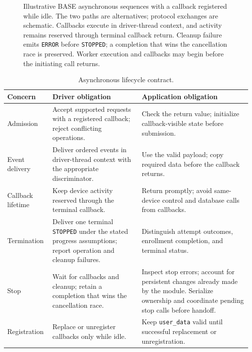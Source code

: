 \begin{figure}[t]
{%
}
\caption{Illustrative BASE asynchronous sequences with a callback registered while idle. The two paths are alternatives; protocol exchanges are schematic. Callbacks execute in driver-thread context, and activity remains reserved through terminal callback return. Cleanup failure emits \texttt{ERROR} before \texttt{STOPPED}; a completion that wins the cancellation race is preserved. Worker execution and callbacks may begin before the initiating call returns.}
\label{fig:async_lifecycle}
\end{figure}

\begin{table}[!t]
\centering
\caption{Asynchronous lifecycle contract.}
\label{tab:lifecycle_contract}
\small
\renewcommand{\arraystretch}{1.2}
\setlength{\tabcolsep}{5pt}
\begin{tabularx}{\textwidth}{|>{\raggedright\arraybackslash}p{}|>{\raggedright\arraybackslash}X|>{\raggedright\arraybackslash}X|}
\hline
\textbf{Concern} & \textbf{Driver obligation} & \textbf{Application obligation} \\ \hline
Admission & Accept supported requests with a registered callback; reject conflicting operations. & Check the return value; initialize callback-visible state before submission. \\ \hline
Event delivery & Deliver ordered events in driver-thread context with the appropriate discriminator. & Use the valid payload; copy required data before the callback returns. \\ \hline
Callback lifetime & Keep device activity reserved through the terminal callback. & Return promptly; avoid same-device control and database calls from callbacks. \\ \hline
Termination & Deliver one terminal \texttt{STOPPED} under the stated progress assumptions; report operation and cleanup failures. & Distinguish attempt outcomes, enrollment completion, and terminal status. \\ \hline
Stop & Wait for callbacks and cleanup; retain a completion that wins the cancellation race. & Inspect stop errors; account for persistent changes already made by the module. Serialize ownership and coordinate pending stop calls before handoff. \\ \hline
Registration & Replace or unregister callbacks only while idle. & Keep \texttt{user\_\allowbreak{}data} valid until successful replacement or unregistration. \\ \hline
\end{tabularx}
\end{table}

